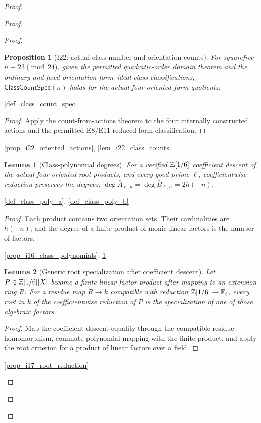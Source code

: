 \documentclass[11pt,a4paper]{article}
\numberwithin{equation}{section}
\theoremstyle{plain}\newtheorem{theorem}{Theorem}[section]\newaliascnt{proposition}{theorem}\newtheorem{proposition}[proposition]{Proposition}\aliascntresetthe{proposition}\newaliascnt{lemma}{theorem}\newtheorem{lemma}[lemma]{Lemma}\aliascntresetthe{lemma}
\theoremstyle{definition}\newaliascnt{definition}{theorem}\newtheorem{definition}[definition]{Definition}\aliascntresetthe{definition}\newaliascnt{notation}{theorem}\newtheorem{notation}[notation]{Notation}\aliascntresetthe{notation}
\providecommand{\lean}[1]{}\providecommand{\leanok}{}
\begin{document}
\begin{proof}
\begin{proof}
\begin{proof}
\begin{proposition}[I22: actual class-number and orientation counts]\label{prop_i22_actual_class_counts}\lean{SptCM.CM.Repaired.actualClassCountSpec_of_E8}\leanok
For squarefree $n\equiv23\pmod{24}$, given the permitted quadratic-order
domain theorem and the ordinary and fixed-orientation form--ideal-class
classifications,
$\mathsf{ClassCountSpec}(n)$ holds for the actual four oriented form
quotients.
\end{proposition}
\begin{uses-statement}\ref{def_class_count_spec}\end{uses-statement}
\begin{proof}
Apply the count-from-actions theorem to the four internally constructed
actions and the permitted E8/E11 reduced-form classification.
\end{proof}
\begin{uses-proof}\ref{prop_i22_oriented_actions}, \ref{lem_i22_class_counts}\end{uses-proof}

\begin{lemma}[Class-polynomial degrees]\label{lem_class_poly_degree}\lean{SptCM.CM.Repaired.ActualClassPolynomialSpec.actualReducedClassPolynomials_degrees}\leanok
For a verified $\mathbb Z[1/6]$ coefficient descent of the actual four oriented root products, and every
good prime $\ell$, coefficientwise reduction preserves the degrees:
$\deg\bar A_{\ell,n}=\deg\bar B_{\ell,n}=2h(-n)$.
\end{lemma}
\begin{uses-statement}\ref{def_class_poly_a}, \ref{def_class_poly_b}\end{uses-statement}
\begin{proof}
Each product contains two orientation sets.  Their cardinalities are $h(-n)$, and the degree of a finite product of monic linear factors is the number of factors.
\end{proof}
\begin{uses-proof}\ref{prop_i16_class_polynomials}, \ref{prop_i22_actual_class_counts}\end{uses-proof}

\begin{lemma}[Generic root specialization after coefficient descent]\label{lem_i18_generic_root_specialization}\lean{SptCM.CM.Repaired.exists_specialized_root_of_reducedPolynomial_root}\leanok
Let $P\in\mathbb Z[1/6][X]$ become a finite linear-factor product after mapping to
an extension ring $R$.  For a residue map $R\to k$ compatible with reduction
$\mathbb Z[1/6]\to\mathbb F_\ell$, every root in $k$ of the coefficientwise reduction of
$P$ is the specialization of one of those algebraic factors.
\end{lemma}
\begin{proof}
Map the coefficient-descent equality through the compatible residue
homomorphism, commute polynomial mapping with the finite product, and apply
the root criterion for a product of linear factors over a field.
\end{proof}
\begin{uses-proof}\ref{prop_i17_root_reduction}\end{uses-proof}


\end{proof}
\end{proof}
\end{proof}
\end{document}
